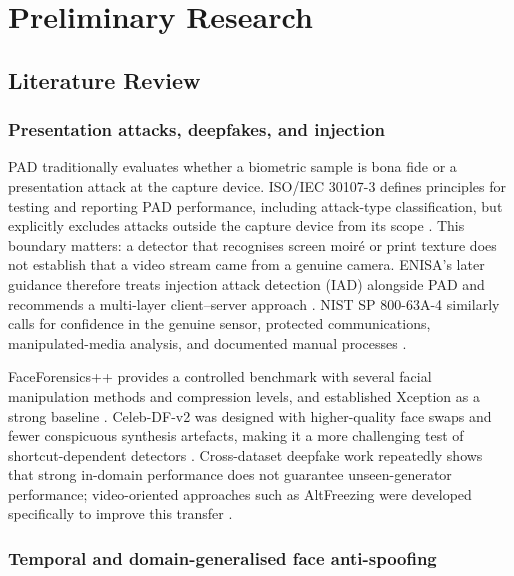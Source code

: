 \chapter{Preliminary Research}
\label{ch:research}

\section{Literature Review}

\subsection{Presentation attacks, deepfakes, and injection}

PAD traditionally evaluates whether a biometric sample is bona fide or a
presentation attack at the capture device. ISO/IEC 30107-3 defines principles for
testing and reporting PAD performance, including attack-type classification, but
explicitly excludes attacks outside the capture device from its scope
\cite{iso30107}. This boundary matters: a detector that recognises screen moir\'e
or print texture does not establish that a video stream came from a genuine
camera. ENISA's later guidance therefore treats injection attack detection (IAD)
alongside PAD and recommends a multi-layer client--server approach
\cite{enisa2024}. NIST SP 800-63A-4 similarly calls for confidence in the genuine
sensor, protected communications, manipulated-media analysis, and documented
manual processes \cite{nist80063a4}.

FaceForensics++ provides a controlled benchmark with several facial manipulation
methods and compression levels, and established Xception as a strong baseline
\cite{rossler2019faceforensics,chollet2017xception}. Celeb-DF-v2 was designed with
higher-quality face swaps and fewer conspicuous synthesis artefacts, making it a
more challenging test of shortcut-dependent detectors \cite{li2020celebdf}.
Cross-dataset deepfake work repeatedly shows that strong in-domain performance
does not guarantee unseen-generator performance; video-oriented approaches such
as AltFreezing were developed specifically to improve this transfer
\cite{wang2023altfreezing}.

\subsection{Temporal and domain-generalised face anti-spoofing}

